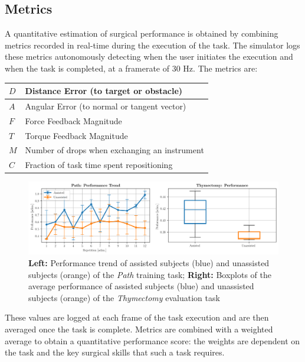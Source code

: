 \documentclass{article}
\begin{document}
\begin{multicols}{2}
\subsection{Metrics}
A quantitative estimation of surgical performance is obtained by combining metrics recorded in real-time during the execution of the task. The simulator logs these metrics autonomously detecting when the user initiates the execution and when the task is completed, at a framerate of 30 Hz. The metrics are:
\begin{center}
  \begin{tabular}{||p{ }|p{ }||}
      \hline
      $D$ & Distance Error (to target or obstacle) \\
      \hline
      $A$ & Angular Error  (to normal or tangent vector) \\
      \hline
      $F$ & Force Feedback Magnitude \\
      \hline
      $T$ & Torque Feedback Magnitude \\
      \hline
      $M$ & Number of drops when exchanging an instrument \\
      \hline
      $C$ & Fraction of task time spent repositioning \\
      \hline
  \end{tabular}
\end{center}
\begin{figure}
  \centering
      \includegraphics[width=\linewidth]{images/results_compact.png}
      \caption{\textbf{Left: }Performance trend of assisted subjects (blue) and unassisted subjects (orange) of the \textit{Path} training task; \textbf{Right: }Boxplots of the average performance of assisted subjects (blue) and unassisted subjects (orange) of the \textit{Thymectomy} evaluation task}
      \label{fig:results_compact}
\end{figure}

These values are logged at each frame of the task execution and are then averaged once the task is complete. Metrics are combined with a weighted average to obtain a quantitative performance score: the weights are dependent on the task and the key surgical skills that such a task requires. 


\end{multicols}
\end{document}
